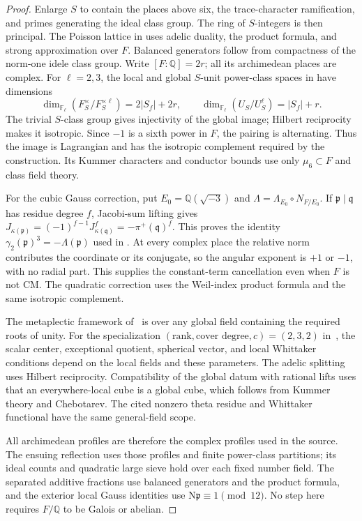 \documentclass[11pt,a4paper]{article}
\numberwithin{equation}{section}
\theoremstyle{remark}
\newcommand{\N}{\mathrm N}
\begin{document}
\begin{proof}
Enlarge $S$ to contain the places above six, the trace-character
ramification, and primes generating the ideal class group.  The
ring of $S$-integers is then principal.  The Poisson lattice in
\cite[Lemma~3.1]{OAI} uses adelic duality, the product formula,
and strong approximation over $F$.  Balanced generators follow
from compactness of the norm-one idele class group.
Write $[F:\mathbb Q]=2r$; all its archimedean places are complex.
For $\ell=2,3$, the local and global $S$-unit power-class spaces
in \cite[Lemma~3.2]{OAI} have dimensions
\[
 \dim_{\mathbb F_\ell}(F_S^\times/F_S^{\times\ell})
 =2|S_f|+2r,\qquad
 \dim_{\mathbb F_\ell}(U_S/U_S^\ell)=|S_f|+r.
\]
The trivial $S$-class group gives injectivity of the global image;
Hilbert reciprocity makes it isotropic.  Since $-1$ is a sixth
power in $F$, the pairing is alternating.  Thus the image is
Lagrangian and has the isotropic complement required by the
construction.  Its Kummer characters and conductor bounds use
only $\mu_6\subset F$ and class field theory.

For the cubic Gauss correction, put $E_0=\mathbb Q(\sqrt{-3})$
and $\Lambda=\Lambda_{E_0}\circ N_{F/E_0}$.  If
$\mathfrak p\mid\mathfrak q$ has residue degree $f$, Jacobi-sum
lifting gives $J_{\kappa(\mathfrak p)}=(-1)^{f-1}
J_{\kappa(\mathfrak q)}^f=-\pi^+(\mathfrak q)^f$.
This proves the identity $\gamma_2(\mathfrak p)^3=-\Lambda(\mathfrak p)$
used in \cite[Lemma~3.4]{OAI}.  At every complex place the relative
norm contributes the coordinate or its conjugate, so the angular
exponent is $+1$ or $-1$, with no radial part.  This supplies the
constant-term cancellation even when $F$ is not CM.
The quadratic correction uses the Weil-index product formula
and the same isotropic complement.

The metaplectic framework of~\cite[Section~0.2 and Chapter~II]{KP}
is over any global field containing the required roots of unity.
For the specialization $(\text{rank},\text{cover degree},c)=(2,3,2)$
in~\cite[Proposition~5.1 and Appendix~A]{OAI}, the scalar center,
exceptional quotient, spherical vector, and local Whittaker
conditions depend on the local fields and these parameters.
The adelic splitting uses Hilbert reciprocity.  Compatibility of
the global datum with rational lifts uses that an everywhere-local
cube is a global cube, which follows from Kummer theory and
Chebotarev.  The cited nonzero theta residue and Whittaker
functional have the same general-field scope.

All archimedean profiles are therefore the complex profiles used
in the source.  The ensuing reflection uses those profiles and
finite power-class partitions; its ideal counts and quadratic
large sieve hold over each fixed number field.  The separated
additive fractions use balanced generators and the product
formula, and the exterior local Gauss identities use
$\N\mathfrak p\equiv1\pmod{12}$.  No step here requires $F/\mathbb Q$
to be Galois or abelian.


\end{proof}
\end{document}
